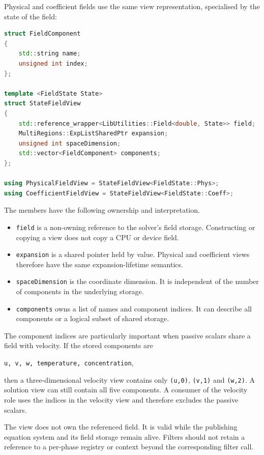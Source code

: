 Physical and coefficient fields use the same view representation, specialised
by the state of the field:

\begin{lstlisting}[language=C++]
struct FieldComponent
{
    std::string name;
    unsigned int index;
};

template <FieldState State>
struct StateFieldView
{
    std::reference_wrapper<LibUtilities::Field<double, State>> field;
    MultiRegions::ExpListSharedPtr expansion;
    unsigned int spaceDimension;
    std::vector<FieldComponent> components;
};

using PhysicalFieldView = StateFieldView<FieldState::Phys>;
using CoefficientFieldView = StateFieldView<FieldState::Coeff>;
\end{lstlisting}

The members have the following ownership and interpretation.

\begin{itemize}
\item \texttt{field} is a non-owning reference to the solver's field storage.
      Constructing or copying a view does not copy a CPU or device field.
\item \texttt{expansion} is a shared pointer held by value. Physical and
      coefficient views therefore have the same expansion-lifetime semantics.
\item \texttt{spaceDimension} is the coordinate dimension. It is independent
      of the number of components in the underlying storage.
\item \texttt{components} owns a list of names and component indices. It can
      describe all components or a logical subset of shared storage.
\end{itemize}

The component indices are particularly important when passive scalars share a
field with velocity. If the stored components are

\begin{center}
\texttt{u, v, w, temperature, concentration},
\end{center}

then a three-dimensional velocity view contains only
\texttt{(u,0)}, \texttt{(v,1)} and \texttt{(w,2)}. A solution view can still
contain all five components. A consumer of the velocity role uses the
indices in the velocity view and therefore excludes the passive scalars.

The view does not own the referenced field. It is valid while the publishing
equation system and its field storage remain alive. Filters should not retain a
reference to a per-phase registry or context beyond the corresponding filter
call.

